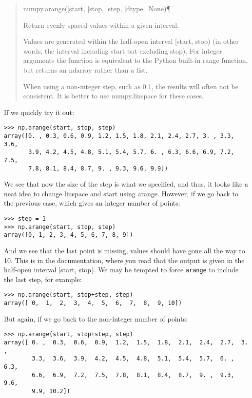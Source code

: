\begin{quote}
 numpy.arange([start, ]stop, [step, ]dtype=None)¶

    Return evenly spaced values within a given interval.

    Values are generated within the half-open interval [start, stop) (in other words, the interval including start but excluding stop). For integer arguments the function is equivalent to the Python built-in range function, but returns an ndarray rather than a list.

    When using a non-integer step, such as 0.1, the results will often not be consistent. It is better to use numpy.linspace for these cases.
\end{quote}

If we quickly try it out:

\begin{verbatim}
>>> np.arange(start, stop, step)
array([0. , 0.3, 0.6, 0.9, 1.2, 1.5, 1.8, 2.1, 2.4, 2.7, 3. , 3.3, 3.6,
       3.9, 4.2, 4.5, 4.8, 5.1, 5.4, 5.7, 6. , 6.3, 6.6, 6.9, 7.2, 7.5,
       7.8, 8.1, 8.4, 8.7, 9. , 9.3, 9.6, 9.9])
\end{verbatim}

We see that now the size of the step is what we specified, and thus, it looks like a neat idea to change linspace and start using arange. However, if we go back to the previous case, which gives an integer number of points:

\begin{verbatim}
>>> step = 1
>>> np.arange(start, stop, step)
array([0, 1, 2, 3, 4, 5, 6, 7, 8, 9])
\end{verbatim}

And we see that the last point is missing, values should have gone all the way to 10. This is in the documentation, where you read that the output is given in the half-open interval [start, stop). We may be tempted to force \texttt{arange} to include the last step, for example:

\begin{verbatim}
>>> np.arange(start, stop+step, step)
array([ 0,  1,  2,  3,  4,  5,  6,  7,  8,  9, 10])
\end{verbatim}

But again, if we go back to the non-integer number of points:

\begin{verbatim}
>>> np.arange(start, stop+step, step)
array([ 0. ,  0.3,  0.6,  0.9,  1.2,  1.5,  1.8,  2.1,  2.4,  2.7,  3. ,
        3.3,  3.6,  3.9,  4.2,  4.5,  4.8,  5.1,  5.4,  5.7,  6. ,  6.3,
        6.6,  6.9,  7.2,  7.5,  7.8,  8.1,  8.4,  8.7,  9. ,  9.3,  9.6,
        9.9, 10.2])
\end{verbatim}

